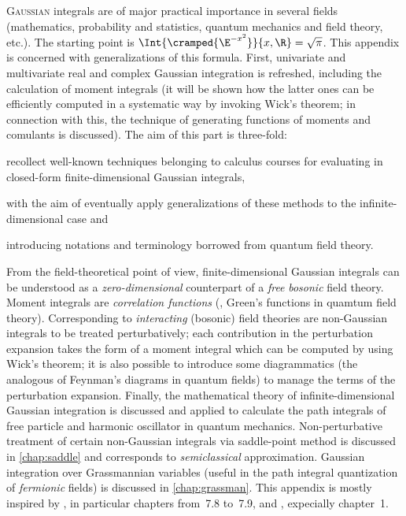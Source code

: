 


\lettrine{G}{aussian} integrals are of major practical importance in several
fields (mathematics, probability and statistics, quantum mechanics and
field theory, etc.). The starting point is $\Int{\cramped{\E^{-x^{2}}}}{x,\R} =
\sqrt{\pi}$. This appendix is concerned with generalizations of this formula.
First, univariate and multivariate real and complex Gaussian
integration is refreshed, including the calculation of moment integrals (it will
be shown how the latter ones can be efficiently computed in a systematic way by
invoking Wick's theorem; in connection with this, the technique of generating
functions of moments and comulants is discussed). The aim of this part is
three-fold:
\begin{inparaenum}[(a)]
  \item recollect well-known techniques belonging to calculus courses for
     evaluating in closed-form finite-dimensional Gaussian integrals,
  \item with the aim of eventually apply generalizations of these methods to
     the 
     infinite-dimensional case and
  \item introducing notations and terminology borrowed from quantum field
     theory.
\end{inparaenum}
From the field-theoretical point of view, 
finite-dimensional Gaussian integrals can be understood as a
\emph{zero-dimensional}
counterpart of a \emph{free} \emph{bosonic} field theory. 
Moment integrals are \emph{correlation functions} (\ie, Green's functions in
quamtum field theory). Corresponding to
\emph{interacting} (bosonic) field
theories are non-Gaussian integrals to be treated perturbatively; each
contribution in the perturbation expansion takes the form of
a moment integral which can be computed 
by using Wick's theorem; it is also possible to introduce
some diagrammatics (the analogous of Feynman's diagrams in quantum fields) to manage
the terms of the
perturbation expansion. Finally, the mathematical theory of infinite-dimensional
Gaussian integration is discussed and applied to calculate the path integrals of
free particle and harmonic oscillator in quantum mechanics. Non-perturbative
treatment of certain non-Gaussian integrals via saddle-point method is discussed
in \cref{chap:saddle} and corresponds to \emph{semiclassical} approximation.
Gaussian integration over Grassmannian variables (useful in
the path integral quantization of \emph{fermionic} fields) is discussed in
\cref{chap:grassman}. This appendix is mostly inspired by
\textcite{Zeidler:2009b}, in particular chapters from~7.8 to~7.9, and
\textcite{Zinn-Justin:2005}, expecially chapter~1.

